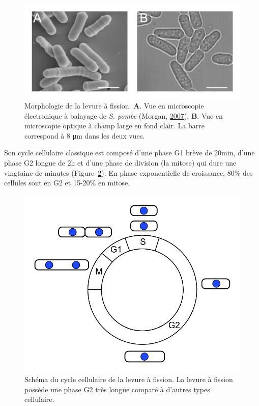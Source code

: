 \documentclass[12pt,a4paper,twoside,openright]{book}
\begin{document}
\begin{figure}[htbp]
\centering
\includegraphics{figures/intro/pombe.png}
\caption[Morphologie de la levure à fission]{\label{fig:pombe}Morphologie
de la levure à fission. \textbf{A}. Vue en microscopie électronique à
balayage de \emph{S. pombe} (Morgan, \hyperref[ref-Morgan2007]{2007}).
\textbf{B}. Vue en microscopie optique à champ large en fond clair. La
barre correspond à 8 μm dans les deux vues.}
\end{figure}

Son cycle cellulaire classique est composé d'une phase G1 brève de
20min, d'une phase G2 longue de 2h et d'une phase de division (la
mitose) qui dure une vingtaine de minutes
(Figure~\ref{fig:pombe-cell-cycle}). En phase exponentielle de
croissance, 80\% des cellules sont en G2 et 15-20\% en mitose.

\begin{figure}[htbp]
\centering
\includegraphics{figures/intro/pombe_cell_cycle.png}
\caption[Schéma du cycle cellulaire de la levure à fission]{\label{fig:pombe-cell-cycle}Schéma
du cycle cellulaire de la levure à fission. La levure à fission possède
une phase G2 très longue comparé à d'autres types cellulaire.}
\end{figure}
\end{document}
